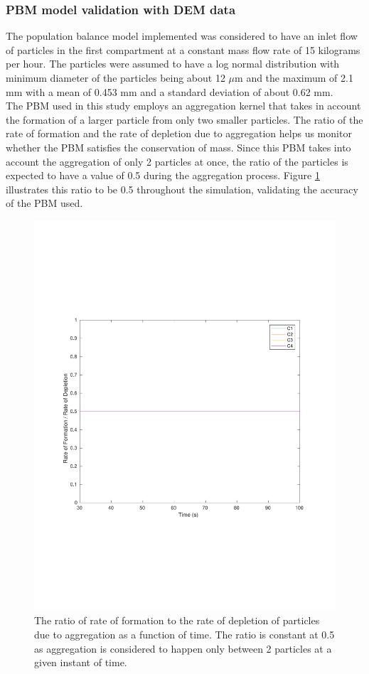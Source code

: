 \documentclass[preprint,11pt,authoryear]{elsarticle}
\begin{document}
\subsubsection{PBM model validation with DEM data}
 The population balance model implemented was considered to have an inlet flow of particles in the 
first compartment at a constant mass flow rate of 15 kilograms per hour. The particles were assumed 
to have a log normal distribution with minimum diameter of the particles being about 12 $\mu$m and the 
maximum of 2.1 mm with a mean of 0.453 mm and a standard deviation of about 0.62 mm. \\
The PBM used in this study employs an aggregation kernel that takes in account the formation of a 
larger particle from only two smaller particles. The ratio of the rate of formation and the rate of 
depletion due to aggregation helps us monitor whether the PBM satisfies the conservation of mass. 
Since this PBM takes into account the aggregation of only 2 particles at once, the ratio of the particles 
is expected to have a value of 0.5 during the aggregation process. Figure \ref{fig:rslts_PBM_ratio_plot_2mm}
 illustrates this ratio to be 0.5 throughout the simulation, validating the accuracy of the PBM used.
\begin{figure}[H]
\begin{center}
\includegraphics[scale=0.5]{rslts_PBM_2mm_validation.pdf}
\caption{The ratio of rate of formation to the rate of depletion of particles due to 
aggregation as a function of time. The ratio is constant at 0.5 as aggregation is 
considered to happen only between 2 particles at a given instant of time.}
\label{fig:rslts_PBM_ratio_plot_2mm}
\end{center}
\end{figure}
\end{document}
